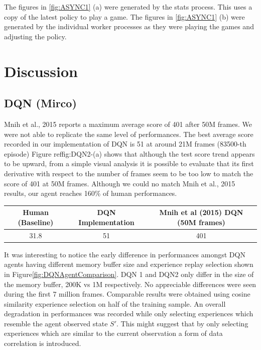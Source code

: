 \documentclass{article}
\begin{document}
The figures in \ref{fig:ASYNC1} (a) were generated by the stats process. This uses a copy of the latest policy to play a game. The figures in \ref{fig:ASYNC1} (b) were generated by the individual worker processes as they were playing the games and adjusting the policy.


\section{Discussion}
    

\subsection{DQN (Mirco)}
Mnih et al., 2015 reports a maximum average score of 401 after 50M frames. We were not able to replicate the same level of performances. The best average score recorded in our implementation of DQN is 51 at around 21M frames (83500-th episode) Figure ref{fig:DQN2}-(a) shows that although the test score trend appears to be upward, from a simple visual analysis it is possible to evaluate that its first derivative with respect to the number of frames seem to be too low to match the score of 401 at 50M frames. Although we could no match Mnih et al., 2015 results, our agent reaches 160\% of human performances.
\begin{table}[h!]
\centering
\begin{tabular}{|c | c | c |} 
 \hline
 Human (Baseline) & DQN Implementation & Mnih et al (2015) DQN (50M frames) \\ [0.5ex] 
 \hline
 31.8 & 51 & 401  \\ 
 \hline
\end{tabular}
\end{table}
It was interesting to notice the early difference in performances amongst DQN agents having different memory buffer size and experience replay selection shown in Figure\ref{fig:DQNAgentComparison}. DQN 1 and DQN2 only differ in the size of the memory buffer, 200K vs 1M respectively. No appreciable differences were seen during the first 7 million frames. Comparable results were obtained using cosine similarity experience selection on half of the training sample. An overall degradation in performances was recorded while only selecting experiences which resemble the agent observed state $S'$. This might suggest that by only selecting experiences which are similar to the current observation a form of data correlation is introduced.
\end{document}

